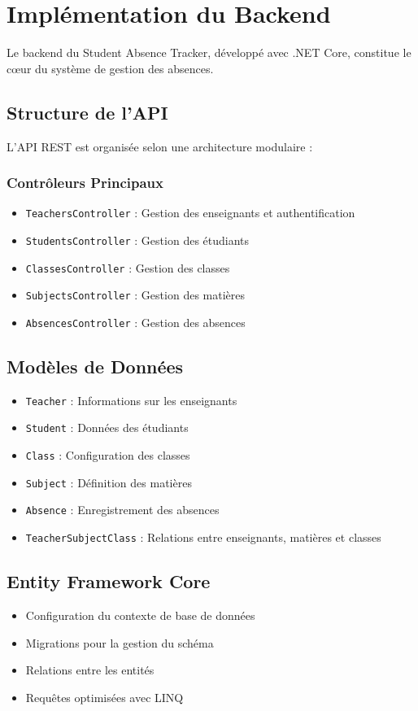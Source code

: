\section{Implémentation du Backend}
\label{sec:backend}

Le backend du Student Absence Tracker, développé avec .NET Core, constitue le cœur du système de gestion des absences.

\subsection{Structure de l'API}
L'API REST est organisée selon une architecture modulaire :

\subsubsection{Contrôleurs Principaux}
\begin{itemize}
    \item \texttt{TeachersController} : Gestion des enseignants et authentification
    \item \texttt{StudentsController} : Gestion des étudiants
    \item \texttt{ClassesController} : Gestion des classes
    \item \texttt{SubjectsController} : Gestion des matières
    \item \texttt{AbsencesController} : Gestion des absences
\end{itemize}

\subsection{Modèles de Données}
\begin{itemize}
    \item \texttt{Teacher} : Informations sur les enseignants
    \item \texttt{Student} : Données des étudiants
    \item \texttt{Class} : Configuration des classes
    \item \texttt{Subject} : Définition des matières
    \item \texttt{Absence} : Enregistrement des absences
    \item \texttt{TeacherSubjectClass} : Relations entre enseignants, matières et classes
\end{itemize}

\subsection{Entity Framework Core}
\begin{itemize}
    \item Configuration du contexte de base de données
    \item Migrations pour la gestion du schéma
    \item Relations entre les entités
    \item Requêtes optimisées avec LINQ
\end{itemize}

